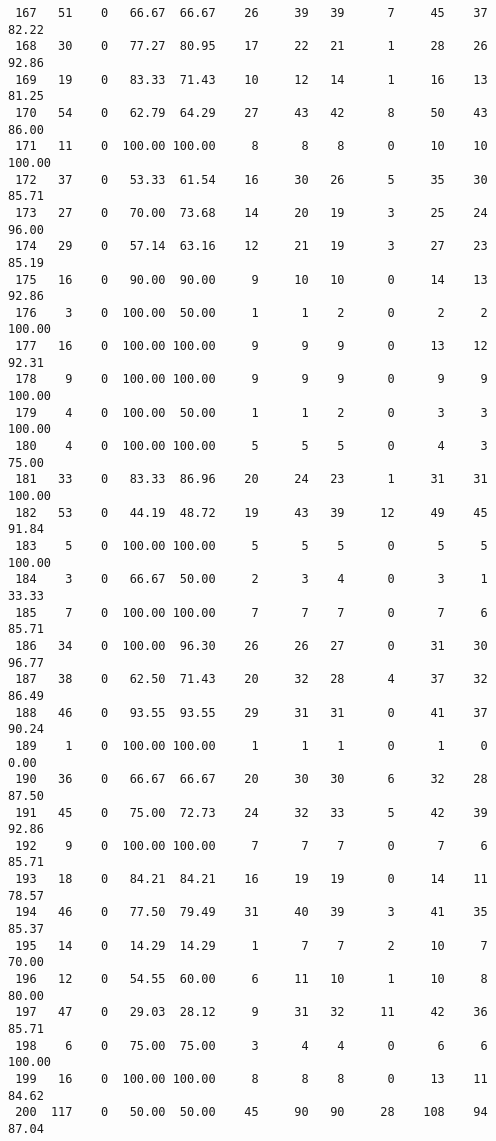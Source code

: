 \begin{verbatim}
 167   51    0   66.67  66.67    26     39   39      7     45    37    82.22
 168   30    0   77.27  80.95    17     22   21      1     28    26    92.86
 169   19    0   83.33  71.43    10     12   14      1     16    13    81.25
 170   54    0   62.79  64.29    27     43   42      8     50    43    86.00
 171   11    0  100.00 100.00     8      8    8      0     10    10   100.00
 172   37    0   53.33  61.54    16     30   26      5     35    30    85.71
 173   27    0   70.00  73.68    14     20   19      3     25    24    96.00
 174   29    0   57.14  63.16    12     21   19      3     27    23    85.19
 175   16    0   90.00  90.00     9     10   10      0     14    13    92.86
 176    3    0  100.00  50.00     1      1    2      0      2     2   100.00
 177   16    0  100.00 100.00     9      9    9      0     13    12    92.31
 178    9    0  100.00 100.00     9      9    9      0      9     9   100.00
 179    4    0  100.00  50.00     1      1    2      0      3     3   100.00
 180    4    0  100.00 100.00     5      5    5      0      4     3    75.00
 181   33    0   83.33  86.96    20     24   23      1     31    31   100.00
 182   53    0   44.19  48.72    19     43   39     12     49    45    91.84
 183    5    0  100.00 100.00     5      5    5      0      5     5   100.00
 184    3    0   66.67  50.00     2      3    4      0      3     1    33.33
 185    7    0  100.00 100.00     7      7    7      0      7     6    85.71
 186   34    0  100.00  96.30    26     26   27      0     31    30    96.77
 187   38    0   62.50  71.43    20     32   28      4     37    32    86.49
 188   46    0   93.55  93.55    29     31   31      0     41    37    90.24
 189    1    0  100.00 100.00     1      1    1      0      1     0     0.00
 190   36    0   66.67  66.67    20     30   30      6     32    28    87.50
 191   45    0   75.00  72.73    24     32   33      5     42    39    92.86
 192    9    0  100.00 100.00     7      7    7      0      7     6    85.71
 193   18    0   84.21  84.21    16     19   19      0     14    11    78.57
 194   46    0   77.50  79.49    31     40   39      3     41    35    85.37
 195   14    0   14.29  14.29     1      7    7      2     10     7    70.00
 196   12    0   54.55  60.00     6     11   10      1     10     8    80.00
 197   47    0   29.03  28.12     9     31   32     11     42    36    85.71
 198    6    0   75.00  75.00     3      4    4      0      6     6   100.00
 199   16    0  100.00 100.00     8      8    8      0     13    11    84.62
 200  117    0   50.00  50.00    45     90   90     28    108    94    87.04

\end{verbatim}
